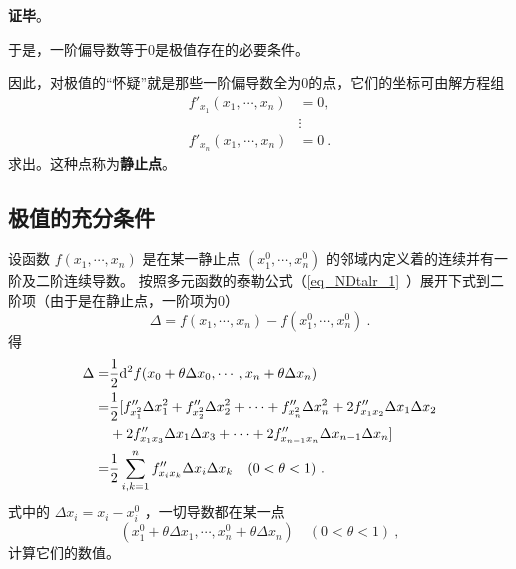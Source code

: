 \textbf{证毕}。

于是，一阶偏导数等于0是极值存在的必要条件。

因此，对极值的“怀疑”就是那些一阶偏导数全为0的点，它们的坐标可由解方程组
\begin{equation}
\begin{aligned}
f'_{x_1}(x_1,\cdots,x_n)&=0,\\
&\vdots\\
f'_{x_n}(x_1,\cdots,x_n)&=0~.
\end{aligned}
\end{equation}
求出。这种点称为\textbf{静止点}。

\subsection{极值的充分条件}
设函数 $f(x_1,\cdots,x_n)$ 是在某一静止点 $(x_1^0,\cdots,x_n^0)$ 的邻域内定义着的连续并有一阶及二阶连续导数。
按照多元函数的泰勒公式（\autoref{eq_NDtalr_1}~）展开下式到二阶项（由于是在静止点，一阶项为0）
\begin{equation}
\Delta=f(x_1,\cdots,x_n)-f(x_1^0,\cdots,x_n^0)~.
\end{equation}
得
\begin{equation}
\begin{aligned}
\Delta=&\frac{1}{2}\mathrm{d}^2 f(x_0+\theta\Delta x_0,\cdots,x_n+\theta\Delta x_n)\\
=&\frac{1}{2}[f''_{x_1^2}\Delta x_1^2+f''_{x_2^2}\Delta x_2^2+\cdots+f''_{x_n^2}\Delta x_n^2+2f''_{x_1x_2}\Delta x_1\Delta x_2\\
&+2f''_{x_1x_3}\Delta x_1\Delta x_3+\cdots+2f''_{x_{n-1}x_n}\Delta x_{n-1}\Delta x_n\large]
 \\
 =&\frac{1}{2}\sum_{i,k=1}^nf''_{x_ix_k}\Delta x_i\Delta x_k \quad (0<\theta<1)~.
\end{aligned}
\end{equation}
式中的 $\Delta x_i=x_i-x_i^0$ ，一切导数都在某一点
\begin{equation}
(x_1^0+\theta\Delta x_1,\cdots,x_n^0+\theta\Delta x_n) \quad (0<\theta<1)~,
\end{equation}
计算它们的数值。

